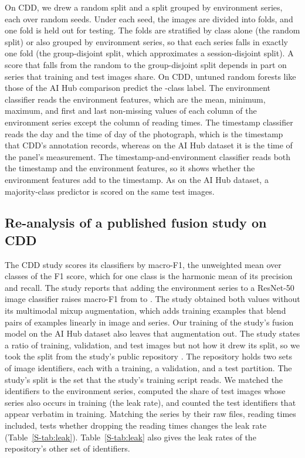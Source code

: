 \documentclass[preprint,12pt,authoryear,nopreprintline]{elsarticle}
\begin{document}
On CDD, we drew a random split and a split grouped by environment series, each over
\cddSeeds{} random seeds. Under each seed, the
images are divided into \cddFolds{} folds, and one fold is held out for testing. The folds are stratified by class alone
(the random split) or also grouped by environment series, so that each series falls in
exactly one fold (the group-disjoint split, which approximates a session-disjoint
split). A score that falls from the random to the group-disjoint split depends in part
on series that training and test images share. On CDD, untuned random forests like those
of the AI Hub comparison predict the \cddClasses{}-class label. The environment
classifier reads the environment features, which are the mean, minimum, maximum, and
first and last non-missing values of each column of the environment series except the
column of reading times. The timestamp
classifier reads the day and the time of
day of the photograph, which is the timestamp that CDD's annotation records, whereas
on the AI Hub dataset it is the time of the panel's measurement. The
timestamp-and-environment classifier reads both the timestamp and the environment
features, so it shows whether the environment features add to the timestamp. As on the
AI Hub dataset, a majority-class predictor is scored on the same test images.

\subsection{Re-analysis of a published fusion study on CDD}
\label{sec:reanalysis}

The CDD study \citep{appliedsci2024dacon} scores its classifiers by macro-F1, the
unweighted mean over classes of the F1 score, which for one class is the harmonic
mean of its precision and recall. The study reports that adding the environment
series to a ResNet-50 image classifier raises macro-F1 from \paperImageFone{} to
\paperMultiFone{} \citep[Table~2]{appliedsci2024dacon}. The study obtained both values
without its multimodal mixup augmentation, which adds training examples that blend
pairs of examples linearly in image and series. Our training of the study's fusion
model on the AI Hub dataset also leaves that augmentation out. The study states a ratio of training,
validation, and test images but not how it drew its split, so we took the split from
the study's public repository \citep{cropdiseaserepo}. The repository holds two sets of image identifiers, each with a training, a validation, and a test partition. The study's
split is the set that the study's training script reads. We matched the identifiers
to the environment series, computed the share of test images whose series also occurs
in training (the leak rate), and counted the test identifiers that appear verbatim in
training. Matching the series by their raw files, reading times included, tests whether
dropping the reading times changes the leak rate (Table~\ref{S-tab:leak}). Table~\ref{S-tab:leak}
also gives the leak rates of the repository's other set of identifiers.
\end{document}
